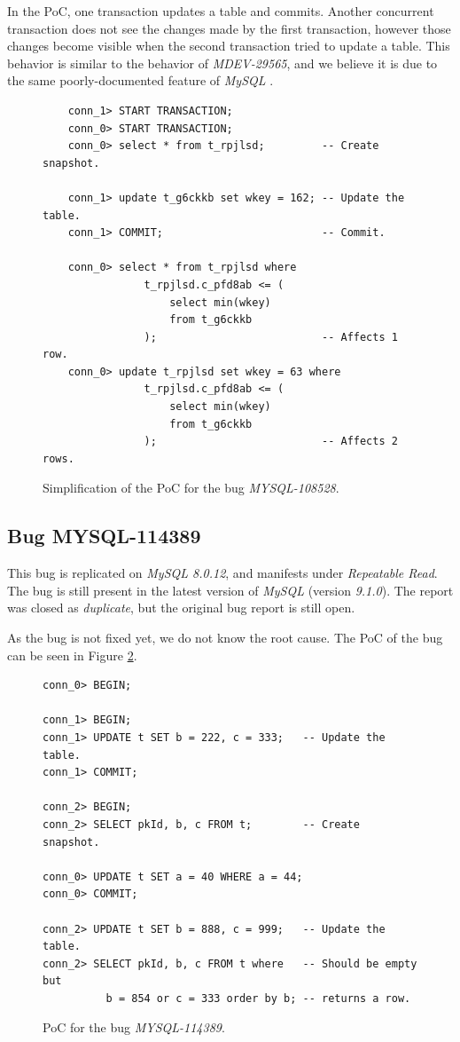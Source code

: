 In the PoC, one transaction updates a table and commits. Another concurrent transaction does not see the changes made by the first transaction, however those changes become visible when the second transaction tried to update a table. This behavior is similar to the behavior of \textit{MDEV-29565}, and we believe it is due to the same poorly-documented feature of \textit{MySQL} \cite{mysqlconsistentread}.


\begin{figure}
\begin{verbatim}
    conn_1> START TRANSACTION;
    conn_0> START TRANSACTION;
    conn_0> select * from t_rpjlsd;         -- Create snapshot.

    conn_1> update t_g6ckkb set wkey = 162; -- Update the table.
    conn_1> COMMIT;                         -- Commit.

    conn_0> select * from t_rpjlsd where
                t_rpjlsd.c_pfd8ab <= (
                    select min(wkey)
                    from t_g6ckkb
                );                          -- Affects 1 row.
    conn_0> update t_rpjlsd set wkey = 63 where
                t_rpjlsd.c_pfd8ab <= (
                    select min(wkey)
                    from t_g6ckkb
                );                          -- Affects 2 rows.
\end{verbatim}
\caption{Simplification of the PoC for the bug \textit{MYSQL-108528}.} \label{fig:MYSQL-108528}
\end{figure}



\subsection*{Bug MYSQL-114389}

This bug is replicated on \textit{MySQL 8.0.12}, and manifests under \textit{Repeatable Read}. The bug is still present in the latest version of \textit{MySQL} (version \textit{9.1.0}). The report was closed as \textit{duplicate}, but the original bug report is still open.

As the bug is not fixed yet, we do not know the root cause. The PoC of the bug can be seen in Figure \ref{fig:MYSQL-114389}.

\begin{figure}
\begin{verbatim}
conn_0> BEGIN;

conn_1> BEGIN;                          
conn_1> UPDATE t SET b = 222, c = 333;   -- Update the table.
conn_1> COMMIT;                         

conn_2> BEGIN;
conn_2> SELECT pkId, b, c FROM t;        -- Create snapshot.

conn_0> UPDATE t SET a = 40 WHERE a = 44;
conn_0> COMMIT;

conn_2> UPDATE t SET b = 888, c = 999;   -- Update the table.
conn_2> SELECT pkId, b, c FROM t where   -- Should be empty but
          b = 854 or c = 333 order by b; -- returns a row.

\end{verbatim}
\caption{PoC for the bug \textit{MYSQL-114389}.} \label{fig:MYSQL-114389}
\end{figure}


